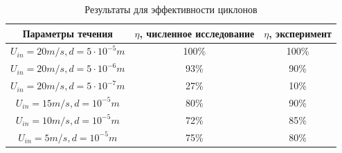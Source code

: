 \begin{center}
	\begin{table}[h]
		\vspace{-1em}
		\caption{Результаты для эффективности циклонов}
		\label{tableSolution}
		\begin{tabular}{|c|c|c|}
			\hline
			Параметры течения & $\eta$, численное исследование & $\eta$, эксперимент \\
			\hline
			$U_{in}=20m/s, d=5 \cdot 10^{-5}m$ & 100\% & 100\% \\
			\hline
			$U_{in}=20m/s, d=5 \cdot 10^{-6}m$ & 93\% & 90\%\\
			\hline
			$U_{in}=20m/s, d=5 \cdot 10^{-7}m$ & 27\% & 10\%\\
			\hline
			$U_{in}=15m/s, d=10^{-5}m$ & 80\% & 90\% \\
			\hline
			$U_{in}=10m/s, d=10^{-5}m$ & 72\% & 85\% \\
			\hline
			$U_{in}=5m/s, d=10^{-5}m$ & 75\% & 80\% \\
			\hline
		\end{tabular}
	\end{table}
\end{center}
\clearpage
